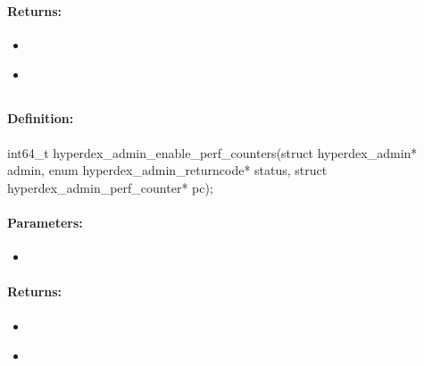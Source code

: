 \paragraph{Returns:}
\begin{itemize}[noitemsep]
\item {}\\

\item {}\\

\end{itemize}

\pagebreak
\subsection{}
\label{api:c:enable_perf_counters}


\paragraph{Definition:}
\begin{ccode}
int64_t hyperdex_admin_enable_perf_counters(struct hyperdex_admin* admin,
        enum hyperdex_admin_returncode* status,
        struct hyperdex_admin_perf_counter* pc);
\end{ccode}

\paragraph{Parameters:}
\begin{itemize}[noitemsep]
\item {}\\

\end{itemize}

\paragraph{Returns:}
\begin{itemize}[noitemsep]
\item {}\\

\item {}\\

\end{itemize}

